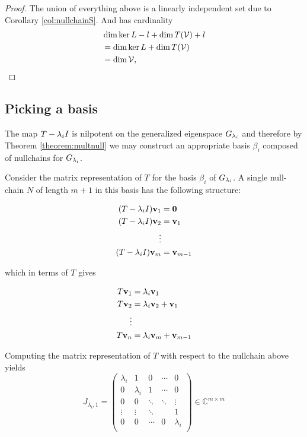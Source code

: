 \begin{proof}
    The union of everything above is a linearly independent set due to Corollary \ref{col:nullchainS}. And has cardinality 
    \begin{align*}
        &\dim\ker L-l+\dim T(\mathcal{V}) + l   \\
        &= \dim\ker L+\dim T(\mathcal{V})      \\
        &= \dim\mathcal{V},
    \end{align*}
\end{proof}

\subsection{Picking a basis}
The map \(T-\lambda_iI\) is nilpotent on the generalized eigenspace \(G_{\lambda_i}\) and therefore by Theorem \ref{theorem:multnull} we may construct an appropriate basis \(\beta_i\) composed of nullchains for \(G_{\lambda_i}\).

Consider the matrix representation of \(T\) for the basis
$\beta_i$ of $G_{\lambda_i}$.
A single null-chain \(N\) of length \(m+1\) in this basis has the following structure:

\begin{align*}
    (T-\lambda_iI)\mathbf{v}_1   & = \mathbf{0}          \\
    (T-\lambda_iI)\mathbf{v}_2   & = \mathbf{v}_1       \\
    \vdots                                  \\
    (T-\lambda_iI)\mathbf{v}_m   & = \mathbf{v}_{m-1}   \\
\end{align*}


which in terms of \(T\) gives

\begin{align*}
    T\mathbf{v}_1 & = \lambda_i \mathbf{v}_1              \\
    T\mathbf{v}_2 & = \lambda_i \mathbf{v}_2 + \mathbf{v}_1      \\
    \vdots                                  \\
    T\mathbf{v}_n & = \lambda_i \mathbf{v}_m + \mathbf{v}_{m-1}  \\
\end{align*}


Computing the matrix representation of \(T\) with respect to the nullchain above yields
\begin{equation}
     J_{\lambda_i, 1}=
    \begin{pmatrix}
        \lambda_i & 1         & 0      & \cdots & 0         \\
        0         & \lambda_i & 1      & \cdots & 0         \\
        0         & 0         & \ddots  & \ddots & \vdots    \\
        \vdots    & \vdots    & \ddots &  & 1         \\

        0         & 0         & \cdots & 0      & \lambda_i \\
    \end{pmatrix} \in \mathbb{C}^{m \times m}
    \label{eq:jordanblock}
\end{equation}


